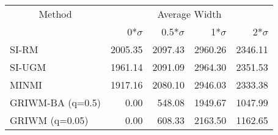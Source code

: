
\begin{tabular}{lrrrr}
\toprule
\multicolumn{1}{c}{Method} & \multicolumn{4}{c}{Average Width} \\
 & 0*$\sigma$ & 0.5*$\sigma$ & 1*$\sigma$ & 2*$\sigma$\\
\midrule
SI-RM & 2005.35 & 2097.43 & 2960.26 & 2346.11\\
SI-UGM & 1961.14 & 2091.09 & 2964.30 & 2351.53\\
MINMI & 1917.16 & 2080.10 & 2946.03 & 2333.38\\
GRIWM-BA (q=0.5) & 0.00 & 548.08 & 1949.67 & 1047.99\\
GRIWM (q=0.05) & 0.00 & 608.33 & 2163.50 & 1162.65\\
\bottomrule
\end{tabular}

